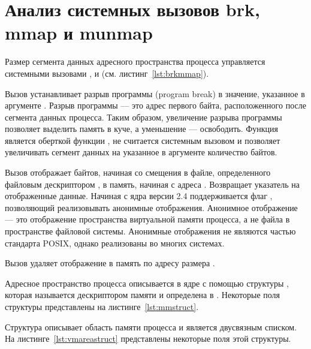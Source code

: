\section{Анализ системных вызовов brk, mmap и munmap}

Размер сегмента данных адресного пространства процесса управляется системными вызовами ,  и  (см. листинг~\ref{lst:brkmmap}).



Вызов  устанавливает разрыв программы (program break) в значение, указанное в аргументе . Разрыв программы --- это адрес первого байта, расположенного после сегмента данных процесса. Таким образом, увеличение разрыва программы позволяет выделить память в куче, а уменьшение --- освободить. Функция  является оберткой функции , не считается системным вызовом и позволяет увеличивать сегмент данных на указанное в аргументе количество байтов.

Вызов  отображает  байтов, начиная со смещения  в файле, определенного файловым дескриптором , в память, начиная с адреса . Возвращает  указатель на отображенные данные. Начиная с ядра версии 2.4 поддерживается флаг , позволяющий реализовывать анонимные отображения. Анонимное отображение --- это отображение пространства виртуальной памяти процесса, а не файла в пространстве файловой системы. Анонимные отображения не являются частью стандарта POSIX, однако реализованы во многих системах.

Вызов  удаляет отображение в память по адресу  размера .

Адресное пространство процесса описывается в ядре с помощью структуры , которая называется дескриптором памяти и определена в . Некоторые поля структуры  представлены на листинге~\ref{lst:mmstruct}.



Структура  описывает область памяти процесса и является двусвязным списком. На листинге~\ref{lst:vmareastruct} представлены некоторые поля этой структуры.

